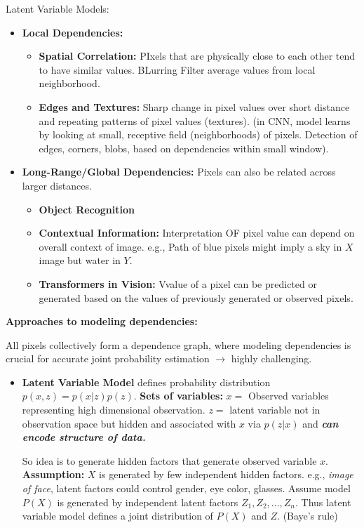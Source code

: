 \documentclass[twocolumn]{article}
\begin{document}
\begin{literaturepaper}{Latent Variable Models:}
\begin{itemize}
    \item \textbf{Local Dependencies:}
    \begin{itemize}
        \item \textbf{Spatial Correlation:} PIxels that are physically close to each other tend to have similar values. BLurring Filter average values from local neighborhood. 
       \item \textbf{Edges and Textures:} Sharp change in pixel values over short distance and repeating patterns of pixel values (textures). (in CNN, model learns by looking at small, receptive field (neighborhoods) of pixels. Detection of edges, corners, blobs, based on dependencies within small window).
    \end{itemize}
    \item \textbf{Long-Range/Global Dependencies:} Pixels can also be related across larger distances.
    \begin{itemize}
        \item \textbf{Object Recognition}
        \item \textbf{Contextual Information:} Interpretation OF pixel value can depend on overall context of image. e.g., Path of blue pixels might imply a sky in $X$ image but water in $Y$.
        \item \textbf{Transformers in Vision:} Vvalue of a pixel can be predicted or generated based on the values of previously generated or observed pixels.
    \end{itemize}
\end{itemize}

\textbf{Approaches to modeling dependencies:}

All pixels collectively form a dependence graph, where modeling dependencies is crucial for accurate joint probability estimation $\rightarrow$ highly challenging.

\begin{itemize}
    \item \textbf{Latent Variable Model} defines probability distribution $p(x,z) = p(x|z)p(z)$. \textbf{Sets of variables:} $x =$ Observed variables representing high dimensional observation. $z =$ latent variable not in observation space but hidden and associated with $x$ via $p(z|x)$ and \textbf{\textit{can encode structure of data.}} 

    So idea is to generate hidden factors that generate observed variable $x$. \textbf{Assumption:} $X$ is generated by few independent hidden factors. e.g., \textit{image of face}, latent factors could control gender, eye color, glasses. Assume model $P(X)$ is generated by independent latent factors $Z_1, Z_2,...,Z_n$. Thus latent variable model defines a joint distribution of $P(X)$ and $Z$. (Baye's rule) 
    \end{itemize}
    

\end{literaturepaper}
\end{document}
